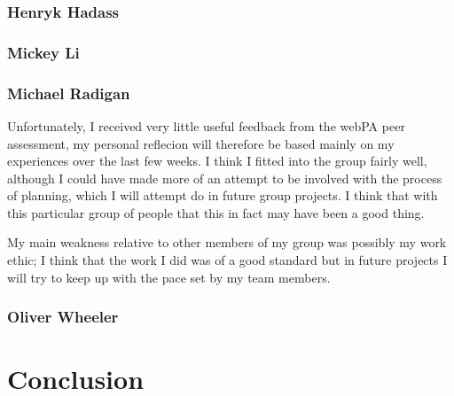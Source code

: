 \documentclass[11pt]{article}
\begin{document}
\subsubsection*{Henryk Hadass}

\subsubsection*{Mickey Li}


\subsubsection*{Michael Radigan}
Unfortunately, I received very little useful feedback from the webPA peer
assessment, my personal reflecion will therefore be based mainly on my
experiences over the last few weeks. I think I fitted into the group fairly 
well, although I could have made more of an attempt to be involved with
the process of planning, which I will attempt do in future group projects.
I think that with this particular group of people that this in fact may have
been a good thing.

My main weakness relative to other members of my group was possibly my work
ethic; I think that the work I did was of a good standard but in future
projects I will try to keep up with the pace set by my team members.



\subsubsection*{Oliver Wheeler}

\section{Conclusion}
\end{document}
